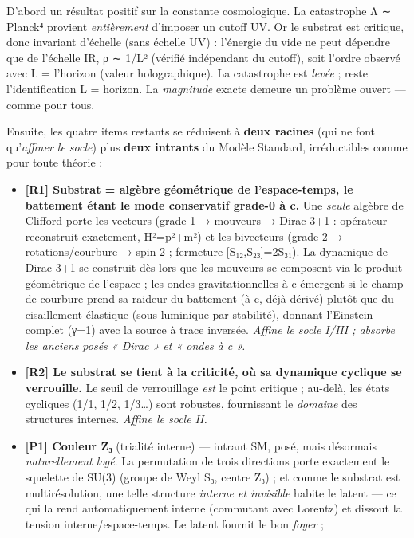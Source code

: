 \documentclass[11pt]{article}
\providecommand{\tightlist}{\setlength{\itemsep}{0pt}\setlength{\parskip}{0pt}}
\begin{document}
D'abord un résultat positif sur la constante cosmologique. La
catastrophe Λ ∼ Planck⁴ provient \emph{entièrement} d'imposer un cutoff
UV. Or le substrat est critique, donc invariant d'échelle (sans échelle
UV) : l'énergie du vide ne peut dépendre que de l'échelle IR, ρ ∼ 1/L²
(vérifié indépendant du cutoff), soit l'ordre observé avec L = l'horizon
(valeur holographique). La catastrophe est \emph{levée} ; reste
l'identification L = horizon. La \emph{magnitude} exacte demeure un
problème ouvert --- comme pour tous.

Ensuite, les quatre items restants se réduisent à \textbf{deux racines}
(qui ne font qu'\emph{affiner le socle}) plus \textbf{deux intrants} du
Modèle Standard, irréductibles comme pour toute théorie :

\begin{itemize}
\tightlist
\item
  \textbf{{[}R1{]} Substrat = algèbre géométrique de l'espace-temps, le
  battement étant le mode conservatif grade-0 à c.} Une \emph{seule}
  algèbre de Clifford porte les vecteurs (grade 1 → mouveurs → Dirac 3+1
  : opérateur reconstruit exactement, H²=p²+m²) et les bivecteurs (grade
  2 → rotations/courbure → spin-2 ; fermeture {[}S₁₂,S₂₃{]}=2S₃₁). La
  dynamique de Dirac 3+1 se construit dès lors que les mouveurs se
  composent via le produit géométrique de l'espace ; les ondes
  gravitationnelles à c émergent si le champ de courbure prend sa
  raideur du battement (à c, déjà dérivé) plutôt que du cisaillement
  élastique (sous-luminique par stabilité), donnant l'Einstein complet
  (γ=1) avec la source à trace inversée. \emph{Affine le socle I/III ;
  absorbe les anciens posés « Dirac » et « ondes à c ».}
\item
  \textbf{{[}R2{]} Le substrat se tient à la criticité, où sa dynamique
  cyclique se verrouille.} Le seuil de verrouillage \emph{est} le point
  critique ; au-delà, les états cycliques (1/1, 1/2, 1/3\ldots) sont
  robustes, fournissant le \emph{domaine} des structures internes.
  \emph{Affine le socle II.}
\item
  \textbf{{[}P1{]} Couleur Z₃} (trialité interne) --- intrant SM, posé,
  mais désormais \emph{naturellement logé}. La permutation de trois
  directions porte exactement le squelette de SU(3) (groupe de Weyl S₃,
  centre Z₃) ; et comme le substrat est multirésolution, une telle
  structure \emph{interne et invisible} habite le latent --- ce qui la
  rend automatiquement interne (commutant avec Lorentz) et dissout la
  tension interne/espace-temps. Le latent fournit le bon \emph{foyer} ;

\end{itemize}
\end{document}
